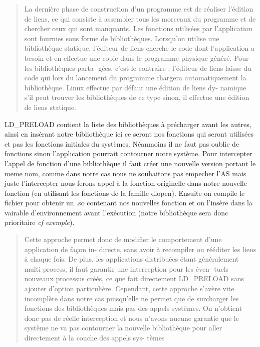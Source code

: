 \documentclass{article}
\begin{document}
\begin{quotation} 
{\color{green} La dernière phase de construction d’un programme est de réaliser
  l’édition de liens, ce qui consiste à assembler tous les morceaux du programme
  et de chercher ceux qui sont manquants.  Les fonctions utilisées par
  l’application sont fournies sous forme de bibliothèques. Lorsqu’on utilise une
  bibliothèque statique, l’éditeur de liens cherche le code dont l’application a
  besoin et en effectue une copie dans le programme physique généré. Pour les
  bibliothèques parta- gées, c’est le contraire : l’éditeur de liens laisse du
  code qui lors du lancement du programme chargera automatiquement la
  bibliothèque. Linux effectue par défaut une édition de liens dy- namique s’il
  peut trouver les bibliothèques de ce type sinon, il effectue une édition de
  liens statique.  }
\end{quotation}

LD\_PRELOAD contient la liste des bibliothèques à précharger avant les autres,
ainsi en insérant notre bibliothèque ici ce seront nos fonctions qui seront
utilisées et pas les fonctions initiales du systèmes. Néanmoins il ne faut pas
oublie de fonctions sinon l'application pourrait contourner notre système. Pour
intercepter l'appel de fonction d'une bibliothèque il faut créer une nouvelle
version portant le meme nom, comme dans notre cas nous ne souhaitons pas
empecher l'AS mais juste l'intercepter nous ferons appel à la fonction
originelle dans notre nouvelle fonction (en utilisant les fonctions de la
famille dlopen). Ensuite on compile le fichier pour obtenir un .so contenant nos
nouvelles fonction et on l'insère dans la vairable d'environnement avant
l'exécution (notre bibliothèque sera donc prioritaire \textit{cf exemple}).

\begin{quotation}
{\color{green} Cette approche permet donc de modifier le comportement d’une
  application de façon in- directe, sans avoir à recompiler ou rééditer les
  liens à chaque fois. De plus, les applications distribuées étant généralement
  multi-process, il faut garantir une interception pour les éven- tuels nouveaux
  processus créés, ce que fait directement LD\_PRELOAD sans ajouter d’option
  particulière. Cependant, cette approche s’avère vite incomplète dans notre cas
  puisqu’elle ne permet que de surcharger les fonctions des bibliothèques mais
  pas des appels systèmes. On n’obtient donc pas de réelle interception et nous
  n’avons aucune garantie que le système ne va pas contourner la nouvelle
  bibliothèque pour aller directement à la couche des appels sys- tèmes}
\end{quotation}
\end{document}
